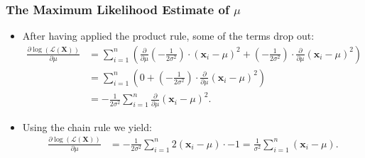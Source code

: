 \begin{frame}
	\frametitle{The Maximum Likelihood Estimate of $\mu$}
	\begin{itemize}
		\item After having applied the product rule, some of the terms drop out:
		      \begin{align}
			      \frac{\partial \log\left(\mathcal{L}(\mathbf{X})\right)}{\partial \mu} & = \sum_{i=1}^{n} \left(\frac{\partial}{\partial\mu}\left(-\frac{1}{2\sigma^2}\right) \cdot (\mathbf{x}_i - \mu)^2 + \left( - \frac{1}{2\sigma^2} \right) \cdot \frac{\partial}{\partial\mu} (\mathbf{x}_i-\mu)^2\right) \\
			                                                                             & = \sum_{i=1}^{n} \left(0 + \left( - \frac{1}{2\sigma^2} \right) \cdot \frac{\partial}{\partial\mu} (\mathbf{x}_i-\mu)^2\right)                                                                                          \\
			                                                                             & = - \frac{1}{2\sigma^2} \sum_{i=1}^{n} \frac{\partial}{\partial\mu} (\mathbf{x}_i-\mu)^2.
		      \end{align}
		\item Using the chain rule we yield:
		      \begin{align}
			      \frac{\partial \log\left(\mathcal{L}(\mathbf{X})\right)}{\partial \mu} & = - \frac{1}{2\sigma^2} \sum_{i=1}^{n}  2(\mathbf{x}_i-\mu) \cdot -1 = \frac{1}{\sigma^2} \sum_{i=1}^{n}  (\mathbf{x}_i-\mu).
		      \end{align}
	\end{itemize}
\end{frame}


